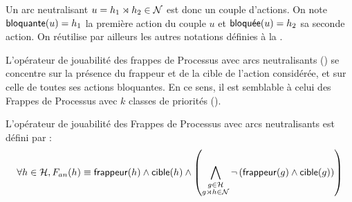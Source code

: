 Un arc neutralisant $u = h_1\rtimes h_2 \in \mathcal{N}$ est donc un couple d'actions.
On note $\mathsf{bloquante}(u) = h_1$ la première action du couple $u$
et $\mathsf{bloqu\acute{e}e}(u) = h_2$ sa seconde action.
On réutilise par ailleurs les autres notations définies à la .

L'opérateur de jouabilité des frappes de Processus avec arcs neutralisants ()
se concentre sur la présence du frappeur et de la cible de l'action considérée,
et sur celle de toutes ses actions bloquantes.
En ce sens, il est semblable à celui des Frappes de Processus avec $k$ classes de priorités
().

\begin{definition}
  L'opérateur de jouabilité des Frappes de Processus avec arcs neutralisants est défini par :
  \[\forall h \in \mathcal{H}, F_{an}(h) \equiv \mathsf{frappeur}(h) \wedge \mathsf{cible}(h) \wedge
    \left( \bigwedge_{\substack{g \in \mathcal{H}\\g\rtimes h \in \mathcal{N}}}
    \neg \left( \mathsf{frappeur}(g) \wedge \mathsf{cible}(g) \right) \right)\]
\end{definition}



